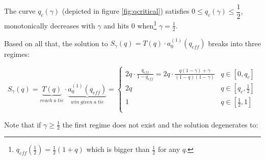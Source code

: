 \documentclass[letterpaper,12pt]{report}
\theoremstyle{plain}
\theoremstyle{definition}
\begin{document}
The curve $q_c(\gamma)$ (depicted in figure \ref{fig:qcritical}) satisfies $0 \leq   q_{c}(\gamma) \leq\dfrac{1}{2}$, monotonically decreases with $\gamma$ and hits $0$ when\footnote{$q_{eff}(\frac{1}{2})=\frac{1}{2}(1+q)$ which is bigger than $\frac{1}{2}$ for any $q$.} $\gamma=\frac{1}{2}$.

Based on all that, the solution to $S_\gamma(q)=T(q)\cdot a_0^{(1)}(q_{eff})$ breaks into three regimes:

\begin{equation}\label{eq:sofq}
S_\gamma(q)=\underbrace{T(q)}_{reach\; a\; tie}\cdot \underbrace{a_0^{(1)}(q_{eff})}_{win\;given\;a\;tie}=
\begin{cases}
2q\cdot\frac{q_{eff}}{1-q_{eff}}=2q\cdot\frac{q(1-\gamma)+\gamma}{(1-q)(1-\gamma)} & q\in [0,q_c] \\ 
2q & q\in [q_c,\frac{1}{2}] \\ 
1 & q\in [\frac{1}{2},1] \\ 
\end{cases}
\end{equation}

\noindent%
\begin{minipage}{\linewidth}
\label{fig:qcritical}
\end{minipage}
\linebreak

Note that if $\gamma\geq\frac{1}{2}$ the first regime does not exist and the solution degenerates to:
\end{document}
